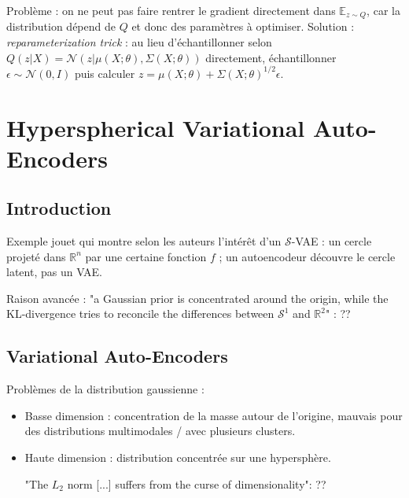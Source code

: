 \documentclass[a4paper]{article}
\begin{document}
	Problème : on ne peut pas faire rentrer le gradient directement dans $\mathbb{E}_{z \sim Q}$, car la distribution dépend de $Q$ et donc des paramètres à optimiser. Solution : \emph{reparameterization trick} : au lieu d'échantillonner selon $Q(z|X) = \mathcal{N}(z|\mu(X; \theta), \Sigma(X; \theta))$ directement, échantillonner $\epsilon \sim \mathcal{N}(0, I)$ puis calculer $z = \mu(X;\theta) + \Sigma(X;\theta)^{1/2}\epsilon$.
	
	\section{Hyperspherical Variational Auto-Encoders}
	
	\subsection{Introduction}
	
	Exemple jouet qui montre selon les auteurs l'intérêt d'un $\mathcal{S}$-VAE : un cercle projeté dans $\mathbb{R}^n$ par une certaine fonction $f$ ; un autoencodeur découvre le cercle latent, pas un VAE.
	
	Raison avancée : "a Gaussian prior is concentrated around the origin, while the KL-divergence tries to reconcile the differences between $\mathcal{S}^1$ and $\mathbb{R}^2$" : ??
	
	\subsection{Variational Auto-Encoders}
	
	Problèmes de la distribution gaussienne :
	\begin{itemize}
		\item Basse dimension : concentration de la masse autour de l'origine, mauvais pour des distributions multimodales / avec plusieurs clusters.
		\item Haute dimension : distribution concentrée sur une hypersphère.
		
		"The $L_2$ norm [...] suffers from the curse of dimensionality": ??
	\end{itemize}
	
\end{document}

